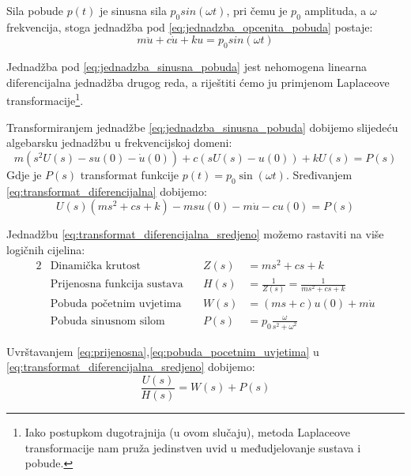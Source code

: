 Sila pobude $p(t)$ je sinusna sila $p_0sin(\omega t)$, pri čemu je $p_0$ amplituda, a
$\omega$ frekvencija, stoga jednadžba pod \eqref{eq:jednadzba_opcenita_pobuda}
postaje:
\begin{equation}
	m\ddot{u} + c\dot{u} + ku = p_0sin(\omega t)
\label{eq:jednadzba_sinusna_pobuda}
\end{equation} 


Jednadžba pod \eqref{eq:jednadzba_sinusna_pobuda} jest nehomogena linearna
diferencijalna jednadžba drugog reda, a riještiti ćemo ju primjenom Laplaceove
transformacije\footnote{Iako postupkom dugotrajnija (u ovom
slučaju), metoda Laplaceove transformacije nam pruža jedinstven uvid u međudjelovanje sustava
i pobude.}.
\par

Transformiranjem jednadžbe \eqref{eq:jednadzba_sinusna_pobuda} dobijemo 
slijedeću algebarsku jednadžbu u frekvencijskoj domeni:
\begin{equation}\label{eq:transformat_diferencijalna}
        m(s^2U(s)-su(0)-\dot{u}(0))+
	c(sU(s)-u(0))+
	kU(s) = 
        P(s)
\end{equation}
Gdje je $P(s)$ transformat funkcije $p(t)=p_0\sin(\omega t)$.
Sređivanjem \eqref{eq:transformat_diferencijalna} dobijemo: 
\begin{equation}\label{eq:transformat_diferencijalna_sredjeno}
    U(s)\left(ms^2+cs+k\right)-msu(0)-m\dot{u}-cu(0) = P(s)
\end{equation}

Jednadžbu \eqref{eq:transformat_diferencijalna_sredjeno} možemo rastaviti na više logičnih
cijelina:
\begin{alignat}{2}
    &\text{Dinamička krutost} & Z(s)&=ms^2+cs+k\label{eq:din_krutost}\\
    &\text{Prijenosna funkcija sustava}\quad & H(s)&=\frac{1}{Z(s)}=\frac{1}{ms^2+cs+k}\label{eq:prijenosna}\\
    &\text{Pobuda početnim uvjetima}\quad & W(s)&=(ms+c)u(0)+m\dot{u}\label{eq:pobuda_pocetni}\\
    &\text{Pobuda sinusnom silom} & P(s)&=p_0\frac{\omega}{s^2+\omega^2}\label{eq:pobuda_sinusna}
\end{alignat}

Uvrštavanjem \eqref{eq:prijenosna},\eqref{eq:pobuda_pocetnim_uvjetima} u 
\eqref{eq:transformat_diferencijalna_sredjeno} dobijemo:
\begin{equation*}
	\frac{U(s)}{H(s)}=W(s)+P(s)
\end{equation*}

